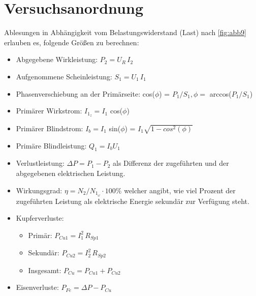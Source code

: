 \documentclass[11pt,ngerman]{scrartcl}
\begin{document}
\newpage

\section{Versuchsanordnung \cite{vorlagetrafo}}\label{sec:Versuchsanordnung}

Ablesungen in Abhängigkeit vom Belastungswiderstand (Last) nach \autoref{fig:abb9} erlauben es, folgende
Größen zu berechnen:

\begin{itemize}

	\item Abgegebene Wirkleistung: $P_2 = U_R\,I_2$

	\item Aufgenommene Scheinleistung: $S_1 = U_1\,I_1$

	\item Phasenverschiebung an der Primärseite: cos($\phi$) = $P_1 / S_1, \phi = $ arccos($P_1 / S_1$)

	\item Primärer Wirkstrom: $I_{1_z} = I_1$ cos($\phi$)

	\item Primärer Blindstrom: $I_b = I_1$ sin($\phi$) = $I_1 \sqrt{1 - cos^2(\phi)}$

	\item Primäre Blindleistung: $Q_1 = I_b U_1$

	\item Verlustleistung: $\Delta P = P_1 - P_2$ als Differenz der zugeführten und der abgegebenen elektrischen Leistung.

	\item Wirkungsgrad: $\eta = N_2 / N_{1_{\omega}} \cdot 100\%$ welcher angibt, wie viel Prozent der zugeführten Leistung als elektrische Energie sekundär zur Verfügung steht.

	\item Kupferverluste:

	      \begin{itemize}

		      \item Primär: $P_{Cu1} = I_1^2 \, R_{Sp1}$

		      \item Sekundär: $P_{Cu2} = I_2^2 \, R_{Sp2}$

		      \item Insgesamt: $P_{Cu} = P_{Cu1} + P_{Cu2}$

	      \end{itemize}

	\item Eisenverluste: $P_{Fe} = \Delta P - P_{Cu}$

\end{itemize}
\end{document}
